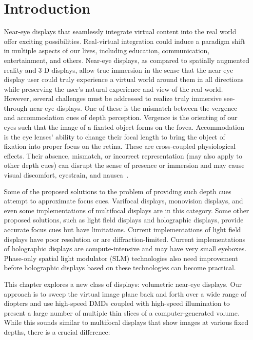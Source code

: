 \section{Introduction}
\label{sec:volumetric:introduction}

Near-eye displays that seamlessly integrate virtual content into the real world offer exciting possibilities. Real-virtual integration could induce a paradigm shift in multiple aspects of our lives, including education, communication, entertainment, and others. Near-eye displays, as compared to spatially augmented reality and 3-D displays, allow true immersion in the sense that the near-eye display user could truly experience a virtual world around them in all directions while preserving the user's natural experience and view of the real world. However, several challenges must be addressed to realize truly immersive see-through near-eye displays. One of these is the mismatch between the vergence and accommodation cues of depth perception. Vergence is the orienting of our eyes such that the image of a fixated object forms on the fovea. Accommodation is the eye lenses' ability to change their focal length to bring the object of fixation into proper focus on the retina. These are cross-coupled physiological effects. Their absence, mismatch, or incorrect representation (may also apply to other depth cues) can disrupt the sense of presence or immersion and may cause visual discomfort, eyestrain, and nausea~\cite{Hoffman2008Vergence}. 

Some of the proposed solutions to the problem of providing such depth cues attempt to approximate focus cues. Varifocal displays, monovision displays, and even some implementations of multifocal displays are in this category. Some other proposed solutions, such as light field displays and holographic displays, provide accurate focus cues but have limitations. Current implementations of light field displays have poor resolution or are diffraction-limited. Current implementations of holographic displays are compute-intensive and may have very small eyeboxes. Phase-only spatial light modulator (SLM) technologies also need improvement before holographic displays based on these technologies can become practical.

This chapter explores a new class of displays: volumetric near-eye displays. Our approach is to sweep the virtual image plane back and forth over a wide range of diopters and use high-speed DMDs coupled with high-speed illumination to present a large number of multiple thin slices of a computer-generated volume. While this sounds similar to multifocal displays that show images at various fixed depths, there is a crucial difference:

